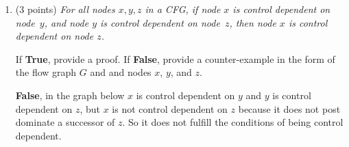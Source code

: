 \documentclass[12pt]{article}
\begin{document}
\begin{enumerate}
\begin{enumerate}
\begin{mdframed}


    \end{mdframed}
  
    \item (3 points) \emph{For all nodes $x, y, z$ in a CFG, if node $x$ is
    control dependent on node~$y$, and node $y$ is control dependent on
    node~$z$, then node $x$ is control dependent on node $z$.}

    If \textbf{True}, provide a proof. If \textbf{False}, provide a
    counter-example in the form of the flow graph $G$ and and nodes $x$,
    $y$, and $z$.
    \begin{mdframed}
      \textbf{False}, in the graph below $x$ is control dependent on $y$ and $y$ is control dependent on $z$, but $x$ is not control dependent on $z$ because it does not post dominate a successor of $z$. So it does not fulfill the conditions of being control dependent.

            


    \end{mdframed}
  \end{enumerate}
  
\end{enumerate}
\end{document}
